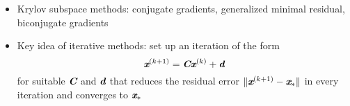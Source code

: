\documentclass[12pt]{article}
\theoremstyle{definition}
\newcommand{\mat}[1]{\textit{\textbf{#1}}}
\begin{document}
\begin{itemize}
\begin{itemize}
                        \item Krylov subspace methods: conjugate gradients, generalized minimal residual, biconjugate gradients
                        \item Key idea of iterative methods: set up an iteration of the form
                            \begin{equation*}
                                \mat{x}^{(k+1)}=\mat{C}\mat{x}^{(k)}+\mat{d}
                            \end{equation*}
                            for suitable $\mat{C}$ and $\mat{d}$ that reduces 
                            the residual error $\|\mat{x}^{(k+1)}-\mat{x}_*\|$ 
                            in every iteration and converges to $\mat{x}_*$
                    \end{itemize}
            \end{itemize}
        
\end{document}
